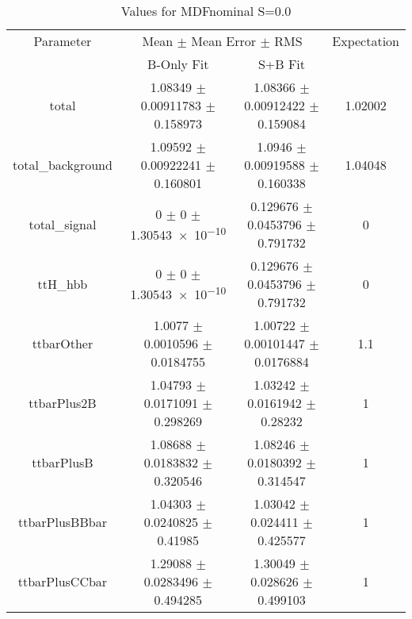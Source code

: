 \begin{table}
\centering
\caption{Values for MDFnominal S=0.0}
\begin{tabular}{cccc}
\toprule
Parameter & \multicolumn{2}{c}{Mean $\pm$ Mean Error $\pm$ RMS} & Expectation\\
 & B-Only Fit & S+B Fit & \\
\midrule
total & \num{1.08349} $\pm$ \num{0.00911783} $\pm$ \num{0.158973} & \num{1.08366} $\pm$ \num{0.00912422} $\pm$ \num{0.159084} & \num{1.02002}\\
total\_background & \num{1.09592} $\pm$ \num{0.00922241} $\pm$ \num{0.160801} & \num{1.0946} $\pm$ \num{0.00919588} $\pm$ \num{0.160338} & \num{1.04048}\\
total\_signal & \num{0} $\pm$ \num{0} $\pm$ \num{1.30543e-10} & \num{0.129676} $\pm$ \num{0.0453796} $\pm$ \num{0.791732} & \num{0}\\
ttH\_hbb & \num{0} $\pm$ \num{0} $\pm$ \num{1.30543e-10} & \num{0.129676} $\pm$ \num{0.0453796} $\pm$ \num{0.791732} & \num{0}\\
ttbarOther & \num{1.0077} $\pm$ \num{0.0010596} $\pm$ \num{0.0184755} & \num{1.00722} $\pm$ \num{0.00101447} $\pm$ \num{0.0176884} & \num{1.1}\\
ttbarPlus2B & \num{1.04793} $\pm$ \num{0.0171091} $\pm$ \num{0.298269} & \num{1.03242} $\pm$ \num{0.0161942} $\pm$ \num{0.28232} & \num{1}\\
ttbarPlusB & \num{1.08688} $\pm$ \num{0.0183832} $\pm$ \num{0.320546} & \num{1.08246} $\pm$ \num{0.0180392} $\pm$ \num{0.314547} & \num{1}\\
ttbarPlusBBbar & \num{1.04303} $\pm$ \num{0.0240825} $\pm$ \num{0.41985} & \num{1.03042} $\pm$ \num{0.024411} $\pm$ \num{0.425577} & \num{1}\\
ttbarPlusCCbar & \num{1.29088} $\pm$ \num{0.0283496} $\pm$ \num{0.494285} & \num{1.30049} $\pm$ \num{0.028626} $\pm$ \num{0.499103} & \num{1}\\
\bottomrule
\end{tabular}
\end{table}